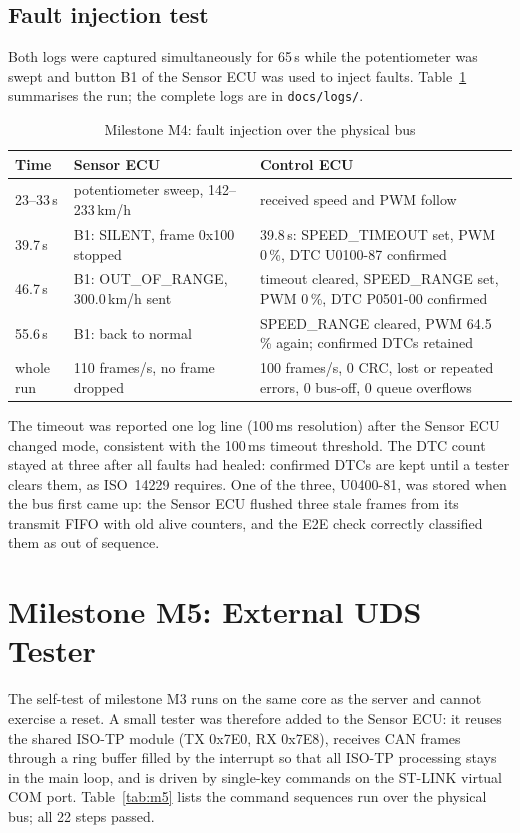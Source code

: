\subsection{Fault injection test}

Both logs were captured simultaneously for 65\,s while the potentiometer was swept and button B1 of the Sensor ECU was used to inject faults. Table~\ref{tab:m4} summarises the run; the complete logs are in \texttt{docs/logs/}.

\begin{table}[H]
\centering
\small
\caption{Milestone M4: fault injection over the physical bus}
\label{tab:m4}
\begin{tabularx}{\textwidth}{@{}lXX@{}}
\toprule
\textbf{Time} & \textbf{Sensor ECU} & \textbf{Control ECU} \\
\midrule
23--33\,s & potentiometer sweep, 142--233\,km/h & received speed and PWM follow \\
39.7\,s & B1: SILENT, frame 0x100 stopped & 39.8\,s: SPEED\_TIMEOUT set, PWM 0\,\%, DTC U0100-87 confirmed \\
46.7\,s & B1: OUT\_OF\_RANGE, 300.0\,km/h sent & timeout cleared, SPEED\_RANGE set, PWM 0\,\%, DTC P0501-00 confirmed \\
55.6\,s & B1: back to normal & SPEED\_RANGE cleared, PWM 64.5\,\% again; confirmed DTCs retained \\
whole run & 110 frames/s, no frame dropped & 100 frames/s, 0 CRC, lost or repeated errors, 0 bus-off, 0 queue overflows \\
\bottomrule
\end{tabularx}
\end{table}

The timeout was reported one log line (100\,ms resolution) after the Sensor ECU changed mode, consistent with the 100\,ms timeout threshold. The DTC count stayed at three after all faults had healed: confirmed DTCs are kept until a tester clears them, as ISO~14229 requires. One of the three, U0400-81, was stored when the bus first came up: the Sensor ECU flushed three stale frames from its transmit FIFO with old alive counters, and the E2E check correctly classified them as out of sequence.

\section{Milestone M5: External UDS Tester}

The self-test of milestone M3 runs on the same core as the server and cannot exercise a reset. A small tester was therefore added to the Sensor ECU: it reuses the shared ISO-TP module (TX 0x7E0, RX 0x7E8), receives CAN frames through a ring buffer filled by the interrupt so that all ISO-TP processing stays in the main loop, and is driven by single-key commands on the ST-LINK virtual COM port. Table~\ref{tab:m5} lists the command sequences run over the physical bus; all 22 steps passed.

